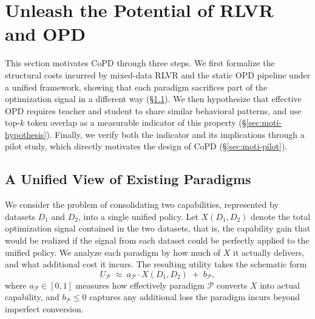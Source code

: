 

\section{Unleash the Potential of RLVR and OPD}
\label{sec:motivation}


This section motivates CoPD through three steps. We first formalize the structural costs incurred by mixed-data RLVR and the static OPD pipeline under a unified framework, showing that each paradigm sacrifices part of the optimization signal in a different way (\S\ref{sec:moti-analysis}). We then hypothesize that effective OPD requires teacher and student to share similar behavioral patterns, and use top-$k$ token overlap as a measurable indicator of this property (\S\ref{sec:moti-hypothesis}). Finally, we verify both the indicator and its implications through a pilot study, which directly motivates the design of CoPD (\S\ref{sec:moti-pilot}).

\subsection{A Unified View of Existing Paradigms}
\label{sec:moti-analysis}

We consider the problem of consolidating two capabilities, represented by datasets $D_1$ and $D_2$, into a single unified policy. Let $X(D_1, D_2)$ denote the total optimization signal contained in the two datasets, that is, the capability gain that would be realized if the signal from each dataset could be perfectly applied to the unified policy. We analyze each paradigm by how much of $X$ it actually delivers, and what additional cost it incurs. The resulting utility takes the schematic form
\begin{equation}
U_{\mathcal{P}} \;\approx\; a_{\mathcal{P}} \cdot X(D_1, D_2) \;+\; b_{\mathcal{P}},
\label{eq:utility-general}
\end{equation}
where $a_{\mathcal{P}} \in [0, 1]$ measures how effectively paradigm $\mathcal{P}$ converts $X$ into actual capability, and $b_{\mathcal{P}} \le 0$ captures any additional loss the paradigm incurs beyond imperfect conversion.

